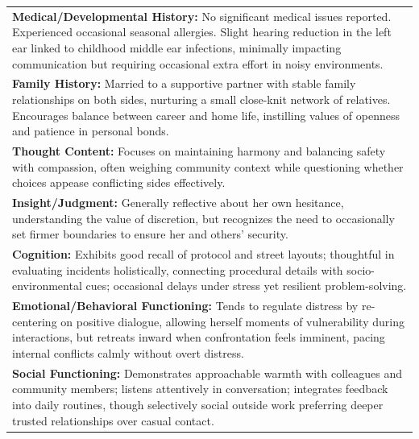 \documentclass[11pt]{article}
\begin{document}
\begin{table}[ht]
\begin{tabularx}{\textwidth}{X}
\textbf{Medical/Developmental History:} No significant medical issues reported. Experienced occasional seasonal allergies. Slight hearing reduction in the left ear linked to childhood middle ear infections, minimally impacting communication but requiring occasional extra effort in noisy environments. \\[4pt]

\textbf{Family History:} Married to a supportive partner with stable family relationships on both sides, nurturing a small close-knit network of relatives. Encourages balance between career and home life, instilling values of openness and patience in personal bonds. \\[4pt]

\textbf{Thought Content:} Focuses on maintaining harmony and balancing safety with compassion, often weighing community context while questioning whether choices appease conflicting sides effectively. \\[4pt]

\textbf{Insight/Judgment:} Generally reflective about her own hesitance, understanding the value of discretion, but recognizes the need to occasionally set firmer boundaries to ensure her and others’ security. \\[4pt]

\textbf{Cognition:} Exhibits good recall of protocol and street layouts; thoughtful in evaluating incidents holistically, connecting procedural details with socio-environmental cues; occasional delays under stress yet resilient problem-solving. \\[4pt]

\textbf{Emotional/Behavioral Functioning:} Tends to regulate distress by re-centering on positive dialogue, allowing herself moments of vulnerability during interactions, but retreats inward when confrontation feels imminent, pacing internal conflicts calmly without overt distress. \\[4pt]

\textbf{Social Functioning:} Demonstrates approachable warmth with colleagues and community members; listens attentively in conversation; integrates feedback into daily routines, though selectively social outside work preferring deeper trusted relationships over casual contact. \\[4pt]


\end{tabularx}
\end{table}
\end{document}
